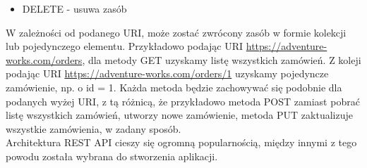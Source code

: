 \documentclass[12pt]{article}
\begin{document}
\begin{sloppypar}
{{\begin{itemize}
      \item DELETE - usuwa zasób
    \end{itemize}
    W zależności od podanego URI, może zostać zwrócony zasób w formie kolekcji lub pojedynczego elementu. 
    Przykładowo podając URI \url{https://adventure-works.com/orders}, dla metody GET uzyskamy listę wszystkich zamówień. 
    Z koleji podając URI \url{https://adventure-works.com/orders/1} uzyskamy pojedyncze zamówienie, np. o id = 1.
    Każda metoda będzie zachowywać się podobnie dla podanych wyżej URI, z tą różnicą, że przykładowo metoda POST zamiast pobrać listę wszystkich zamówień, utworzy nowe zamówienie, 
    metoda PUT zaktualizuje wszystkie zamówienia, w zadany sposób.\\
    Architektura REST API cieszy się ogromną popularnością, między innymi z tego powodu została wybrana do stworzenia aplikacji.
  }
}
\end{sloppypar}
\end{document}

